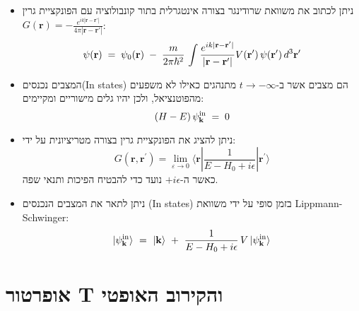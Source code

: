 \documentclass{tstextbook}
\begin{document}
\begin{summary}
  \begin{itemize}
    \item ניתן לכתוב את משוואת שרודינגר בצורה אינטגרלית בתור קונבולוציה עם הפונקציית גרין \(G\left( \mathbf{r} \right)=-\frac{e^{i k |\mathbf{r}-\mathbf{r}'|}}{4\pi |\mathbf{r}-\mathbf{r}'|}\):
$$\psi({\bf r})\;=\;\psi_{0}({\bf r})\;-\;\frac{m}{2\pi\hbar^{2}}\,\int\frac{e^{i k|{\bf r}-{\bf r}^{\prime}|}}{|{\bf r}-{\bf r}^{\prime}|}V({\bf r}^{\prime})\,\psi({\bf r}^{\prime})\,d^{3}{\bf r}^{\prime}$$
    \item המצבים נכנסים(In states) הם מצבים אשר ב-\(t\to -\infty\) מתנהגים כאילו לא משפעים מהפוטנציאל, ולכן יהיו גלים מישוריים ומקיימים:
$$\left(H-E\right)\psi_{\bf k}^{\mathrm{in}}\;=\;0$$
    \item ניתן להציג את הפונקציית גרין בצורה מטריציונית על ידי:
$$G(\mathbf{r},\mathbf{r^{\prime}})=\lim_{ \varepsilon \to 0 } \langle\mathbf{r}|{\frac{1}{E-H_{0}+i\epsilon}}|\mathbf{r^{\prime}}\rangle$$
כאשר ה-\(+i\epsilon\) נועד כדי להבטיח הפיכות ותנאי שפה.
    \item ניתן לתאר את המצבים הנכנסים (In states) בזמן סופי על ידי משוואת Lippmann-Schwinger:
$$|\psi_{\bf k}^{\mathrm{in}}\rangle\ =\ |{\bf k}\rangle\ +\ \frac{1}{E-H_{0}+i\epsilon}\,V\,|\psi_{\bf k}^{\mathrm{in}}\rangle$$
  \end{itemize}
\end{summary}
\section{אופרטור T והקירוב האופטי}
\end{document}
